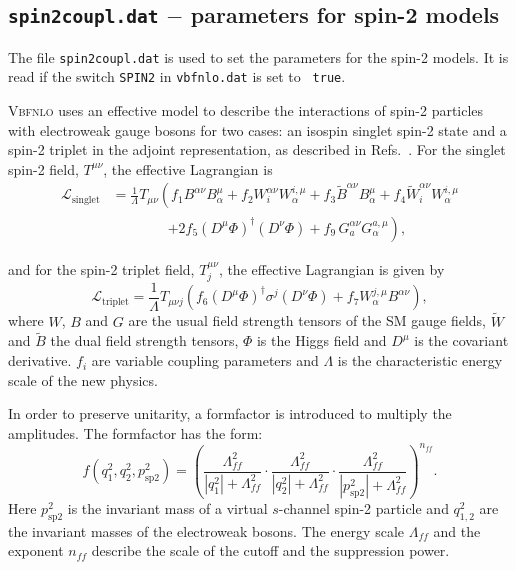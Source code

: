 \documentclass[english,12pt]{article}
\begin{document}

\subsection{{\tt spin2coupl.dat} $-$ parameters for spin-2 models}

The file {\tt spin2coupl.dat} is used to set the parameters for the spin-2
models.  It is read if the switch {\tt SPIN2} in {\tt vbfnlo.dat} is set to {\tt
true}.

\textsc{Vbfnlo} uses an effective model to describe the interactions of spin-2
particles with electroweak gauge bosons for two cases: an isospin singlet spin-2 state
and a spin-2 triplet in the adjoint representation, as described in
Refs.~\cite{frank,Frank:2012wh,Frank:2013gca}. For the singlet spin-2 field, $T^{\mu\nu}$, the effective
Lagrangian is
\begin{align}
 \mathcal{L}_{\text{singlet}} & = \frac{1}{\Lambda} T_{\mu \nu} \left( f_{1} B^{\alpha \nu} B^{\mu}_{\alpha} + f_{2} W_{i}^{\alpha \nu} W^{i,\mu}_{\alpha} + f_3 \widetilde{B}^{\alpha \nu} B^\mu_{\alpha} 
+f_4\widetilde{W}_i^{\alpha \nu} W^{i, \mu}_{\alpha} \right. \nonumber \\
 & \quad \quad \quad \quad \left. +  2 f_{5} (D^{\mu} \Phi)^{\dagger} (D^{\nu}\Phi) + f_9 \, G^{\alpha \nu}_{a} G^{a, \mu}_{\alpha} \right),
\end{align}

and for the spin-2 triplet field, $T_{j}^{\mu\nu}$, the effective Lagrangian is given by
\begin{equation}
 \mathcal{L}_{\text{triplet}} = \frac{1}{\Lambda} T_{\mu\nu j} \left( f_{6} (D^{\mu}\Phi)^{\dagger} \sigma^{j} (D^{\nu} \Phi) + f_{7} W^{j,\mu}_{\alpha} B^{\alpha\nu} \right),
\end{equation}
where $W$, $B$ and $G$ are the usual field strength tensors of the SM gauge fields,
$\widetilde{W}$ and $\widetilde{B}$ the dual field strength tensors, $\Phi$ is
the Higgs field and $D^{\mu}$ is the covariant derivative.  $f_{i}$ are variable
coupling parameters and $\Lambda$ is the characteristic energy scale of the new
physics.

In order to preserve unitarity, a formfactor is introduced to multiply the
amplitudes.  The formfactor has the form:
\begin{equation}
 f(q_{1}^{2}, q_{2}^{2}, p^{2}_{\text{sp2}}) = \left( \frac{\Lambda_{ff}^{2}} {\left|q_{1}^{2}\right| + \Lambda_{ff}^{2}} \cdot \frac{\Lambda_{ff}^{2}} {\left|q_{2}^{2}\right| + \Lambda_{ff}^{2}} \cdot \frac{\Lambda_{ff}^{2}} {\left|p_{\text{sp2}}^{2}\right| + \Lambda_{ff}^{2}} \right) ^{n_{ff}}.
\end{equation}
Here $p^{2}_{\text{sp2}}$ is the invariant mass of a virtual $s$-channel spin-2 particle
and $q_{1,2}^{2}$ are the invariant masses of the electroweak bosons.  The
energy scale $\Lambda_{ff}$ and the exponent $n_{ff}$ describe the scale of the
cutoff and the suppression power.
\end{document}
